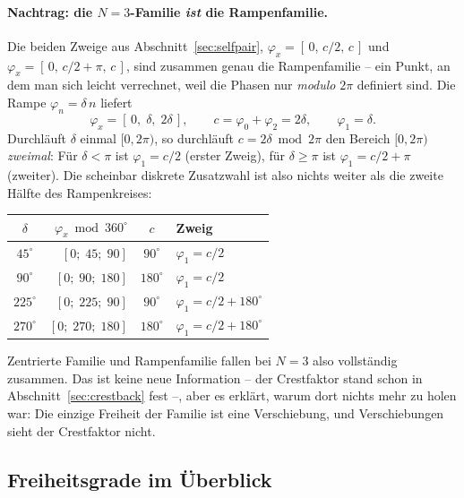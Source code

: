 \documentclass[11pt,a4paper]{article}
\begin{document}
\paragraph{Nachtrag: die \boldmath$N=3$-Familie \emph{ist} die Rampenfamilie.}
Die beiden Zweige aus Abschnitt~\ref{sec:selfpair},
$\varphi_x=[\,0,\,c/2,\,c\,]$ und $\varphi_x=[\,0,\,c/2+\pi,\,c\,]$, sind zusammen
genau die Rampenfamilie -- ein Punkt, an dem man sich leicht verrechnet, weil die
Phasen nur \emph{modulo} $2\pi$ definiert sind. Die Rampe
$\varphi_n = \delta\,n$ liefert
\begin{equation}
  \varphi_x = [\,0,\;\delta,\;2\delta\,],
  \qquad c = \varphi_0+\varphi_2 = 2\delta,
  \qquad \varphi_1 = \delta .
\end{equation}
Durchläuft $\delta$ einmal $[0,2\pi)$, so durchläuft $c = 2\delta \bmod 2\pi$
den Bereich $[0,2\pi)$ \emph{zweimal}: Für $\delta<\pi$ ist $\varphi_1 = c/2$
(erster Zweig), für $\delta\ge\pi$ ist $\varphi_1 = c/2+\pi$ (zweiter). Die
scheinbar diskrete Zusatzwahl ist also nichts weiter als die zweite Hälfte
des Rampenkreises:

\begin{center}
\begin{tabular}{crcl}
  \toprule
  $\delta$ & $\varphi_x \bmod 360^\circ$ & $c$ & Zweig\\
  \midrule
  $45^\circ$  & $[0;\;45;\;90]$  & $90^\circ$  & $\varphi_1 = c/2$\\
  $90^\circ$  & $[0;\;90;\;180]$ & $180^\circ$ & $\varphi_1 = c/2$\\
  $225^\circ$ & $[0;\;225;\;90]$ & $90^\circ$  & $\varphi_1 = c/2+180^\circ$\\
  $270^\circ$ & $[0;\;270;\;180]$& $180^\circ$ & $\varphi_1 = c/2+180^\circ$\\
  \bottomrule
\end{tabular}
\end{center}

\noindent Zentrierte Familie und Rampenfamilie fallen bei $N=3$ also
vollständig zusammen. Das ist keine neue Information -- der Crestfaktor stand
schon in Abschnitt~\ref{sec:crestback} fest --, aber es erklärt, warum dort
nichts mehr zu holen war: Die einzige Freiheit der Familie ist eine
Verschiebung, und Verschiebungen sieht der Crestfaktor nicht.

\subsection{Freiheitsgrade im Überblick}
\end{document}
